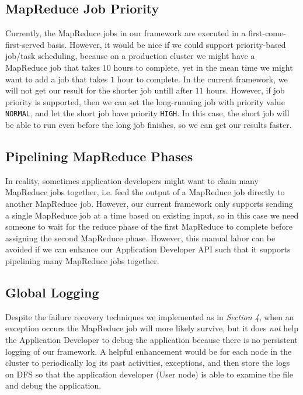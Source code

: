 \documentclass{article} %
\begin{document}
\subsection{MapReduce Job Priority}
    \par\qquad Currently, the MapReduce jobs in our framework are executed in a first-come-first-served basis. However, it would be nice if we could support priority-based job/task scheduling, because on a production cluster we might have a MapReduce job that takes $10$ hours to complete, yet in the mean time we might want to add a job that takes $1$ hour to complete. In the current framework, we will not get our result for the shorter job untill after $11$ hours. However, if job priority is supported, then we can set the long-running job with priority value \texttt{NORMAL}, and let the short job have priority \texttt{HIGH}. In this case, the short job will be able to run even before the long job finishes, so we can get our results faster.
    
\subsection{Pipelining MapReduce Phases}
    \par\qquad In reality, sometimes application developers might want to chain many MapReduce jobs together, i.e. feed the output of a MapReduce job directly to another MapReduce job. However, our current framework only supports sending a single MapReduce job at a time based on existing input, so in this case we need someone to wait for the reduce phase of the first MapReduce to complete before assigning the second MapReduce phase. However, this manual labor can be avoided if we can enhance our Application Developer API such that it supports pipelining many MapReduce jobs together.

\subsection{Global Logging}
    \par\qquad Despite the failure recovery techniques we implemented as in \emph{Section 4}, when an exception occurs the MapReduce job will more likely survive, but it does \emph{not} help the Application Developer to debug the application because there is no persistent logging of our framework. A helpful enhancement would be for each node in the cluster to periodically log its past activities, exceptions, and then store the logs on DFS so that the application developer (User node) is able to examine the file and debug the application.
\end{document}

